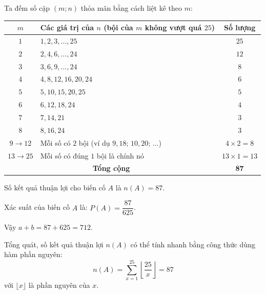 \begin{ex}
{		Ta đếm số cặp $(m; n)$ thỏa mãn bằng cách liệt kê theo $m$:
		\begin{center}
			\begin{tabular}{|c|l|c|}
				\hline
				$m$ & Các giá trị của $n$ (bội của $m$ không vượt quá $25$) & Số lượng \\ \hline
				$1$ & $1, 2, 3, \dots, 25$ & $25$ \\ \hline
				$2$ & $2, 4, 6, \dots, 24$ & $12$ \\ \hline
				$3$ & $3, 6, 9, \dots, 24$ & $8$ \\ \hline
				$4$ & $4, 8, 12, 16, 20, 24$ & $6$ \\ \hline
				$5$ & $5, 10, 15, 20, 25$ & $5$ \\ \hline
				$6$ & $6, 12, 18, 24$ & $4$ \\ \hline
				$7$ & $7, 14, 21$ & $3$ \\ \hline
				$8$ & $8, 16, 24$ & $3$ \\ \hline
				$9 \to 12$ & Mỗi số có $2$ bội (ví dụ $9, 18$; $10, 20$; ...) & $4 \times 2 = 8$ \\ \hline
				$13 \to 25$ & Mỗi số có đúng $1$ bội là chính nó & $13 \times 1 = 13$ \\ \hline
				\multicolumn{2}{|c|}{\textbf{Tổng cộng}} & \textbf{87} \\ \hline
			\end{tabular}
		\end{center}
		
		Số kết quả thuận lợi cho biến cố $A$ là $n(A) = 87$.
		
		Xác suất của biến cố $A$ là: $P(A) = \dfrac{87}{625}$.
		
		Vậy $a + b = 87 + 625 = 712$.
		
		
		\begin{luuy}
			Tổng quát, số kết quả thuận lợi $n(A)$ có thể tính nhanh bằng công thức dùng hàm phần nguyên:
			$$n(A) = \sum_{x=1}^{25} \left\lfloor \dfrac{25}{x} \right\rfloor=87$$
			với $\lfloor x \rfloor$ là phần nguyên của $x$.
		\end{luuy}
	}
\end{ex}


